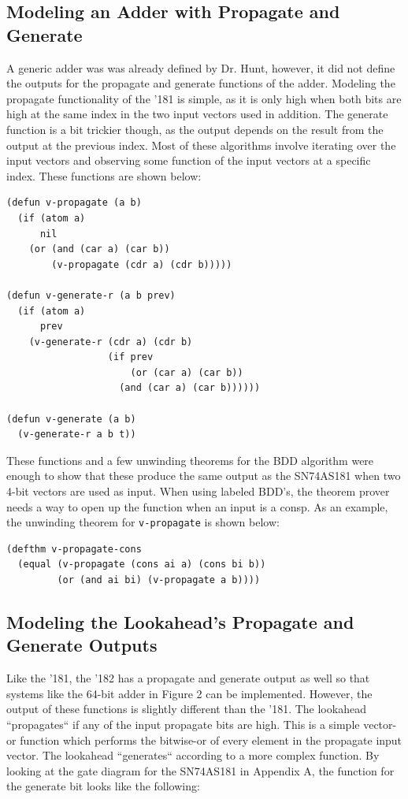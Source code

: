 \documentclass[fleqn,10pt]{SelfArx} %
\begin{document}
\subsection{Modeling an Adder with Propagate and Generate}
A generic adder was was already defined by Dr. Hunt, however, it did not define the outputs for the propagate and generate functions of the adder. Modeling the propagate functionality of the '181 is simple, as it is only high when both bits are high at the same index in the two input vectors used in addition. The generate function is a bit trickier though, as the output depends on the result from the output at the previous index. Most of these algorithms involve iterating over the input vectors and observing some function of the input vectors at a specific index. These functions are shown below:

\begin{lstlisting}
(defun v-propagate (a b)
  (if (atom a)
      nil
    (or (and (car a) (car b))
        (v-propagate (cdr a) (cdr b)))))

(defun v-generate-r (a b prev)
  (if (atom a)
      prev
    (v-generate-r (cdr a) (cdr b)
                  (if prev
                      (or (car a) (car b))
                    (and (car a) (car b))))))

(defun v-generate (a b)
  (v-generate-r a b t))
\end{lstlisting}

These functions and a few unwinding theorems for the BDD algorithm were enough to show that these produce the same output as the SN74AS181 when two 4-bit vectors are used as input. When using labeled BDD's, the theorem prover needs a way to open up the function when an input is a consp. As an example, the unwinding theorem for \lstinline{v-propagate} is shown below:
\begin{lstlisting}
(defthm v-propagate-cons
  (equal (v-propagate (cons ai a) (cons bi b))
         (or (and ai bi) (v-propagate a b))))
\end{lstlisting}

\subsection{Modeling the Lookahead's Propagate and Generate Outputs}
Like the '181, the '182 has a propagate and generate output as well so that systems like the 64-bit adder in Figure 2 can be implemented. However, the output of these functions is slightly different than the '181. The lookahead ``propagates`` if any of the input propagate bits are high. This is a simple vector-or function which performs the bitwise-or of every element in the propagate input vector. The lookahead ``generates`` according to a more complex function. By looking at the gate diagram for the SN74AS181 in Appendix A, the function for the generate bit looks like the following:
\end{document}
